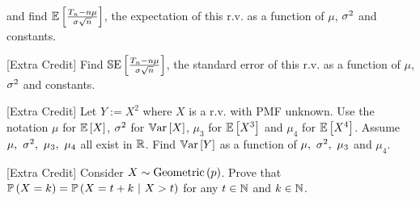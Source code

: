 \documentclass[12pt]{article}
\begin{document}
\beqn
{}
\eeqn

and find $\mathbb{E}\left[\frac{T_n - n\mu}{\sigma\sqrt{n}}\right]$, the expectation of this r.v. as a function of $\mu$, $\sigma^2$ and constants.  

 [Extra Credit] Find $\mathbb{S}\text{E}\left[\frac{T_n - n\mu}{\sigma\sqrt{n}}\right]$, the standard error of this r.v. as a function of $\mu$, $\sigma^2$ and constants.  

 [Extra Credit] Let $Y := X^2$ where $X$ is a r.v. with PMF unknown. Use the notation $\mu$ for $\mathbb{E}\left[X\right]$, $\sigma^2$ for $\mathbb{V}\text{ar}\left[X\right]$, $\mu_3$ for $\mathbb{E}\left[X^3\right]$ and $\mu_4$ for $\mathbb{E}\left[X^4\right]$. Assume $\mu,~\sigma^2,~\mu_3,~\mu_4$ all exist in $\mathbb{R}$. Find $\mathbb{V}\text{ar}\left[Y\right]$ as a function of $\mu,~\sigma^2,~\mu_3$ and $\mu_4$.  

 [Extra Credit] Consider $X \sim \mathrm{Geometric}\left(p\right)$. Prove that $\mathbb{P}\left(X = k\right) = \mathbb{P}\left(X = t +k~|~X > t\right)$ for any $t \in \mathbb{N}$ and $k \in \mathbb{N}$.

\eenum
\end{document}

